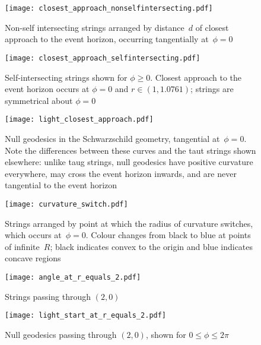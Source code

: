 \documentclass[prb,preprint]{revtex4-1}
\begin{document}
\begin{figure}[p] %
\centering
\texttt{[image: closest\_approach\_nonselfintersecting.pdf]}
\caption{Non-self intersecting strings arranged by distance~$d$ of
  closest approach to the event horizon, occurring tangentially
  at~$\phi=0$}
\label{closest_approach_non_self_intersecting}
\end{figure}

\begin{figure}[p] %
\centering
\texttt{[image: closest\_approach\_selfintersecting.pdf]}
\caption{Self-intersecting strings shown for $\phi\geq 0$.  Closest
  approach to the event horizon occurs at $\phi=0$ and
  $r\in\left(1,1.0761\right)$; strings are symmetrical about $\phi=0$}
\label{closest_approach_self_intersecting}
\end{figure}

\begin{figure}[p] %
\centering
\texttt{[image: light\_closest\_approach.pdf]}
\caption{Null geodesics in the Schwarzschild geometry, tangential
  at~$\phi=0$.  Note the differences between these curves and the taut
  strings shown elsewhere: unlike taug strings, null geodesics have
  positive curvature everywhere, may cross the event horizon inwards,
  and are never tangential to the event horizon}
\label{light_closest_approach}
\end{figure}

\begin{figure}[p]
\centering
\texttt{[image: curvature\_switch.pdf]} %
\caption{Strings arranged by point at which the radius of curvature
  switches, which occurs at~$\phi=0$.  Colour changes from black to
  blue at points of infinite~$R$; black indicates convex to the origin
  and blue indicates concave regions}
\label{curvature_switch}
\end{figure}

\begin{figure}[p]
\centering
\texttt{[image: angle\_at\_r\_equals\_2.pdf]} %
\caption{Strings passing through $(2,0)$}
\label{strings_r_equals_2}
\end{figure}

\begin{figure}[p]
\centering
\texttt{[image: light\_start\_at\_r\_equals\_2.pdf]} %
\caption{Null geodesics passing through $(2,0)$, shown for $0\leq\phi\leq 2\pi$}
\label{light_r_equals_2}
\end{figure}
\end{document}
